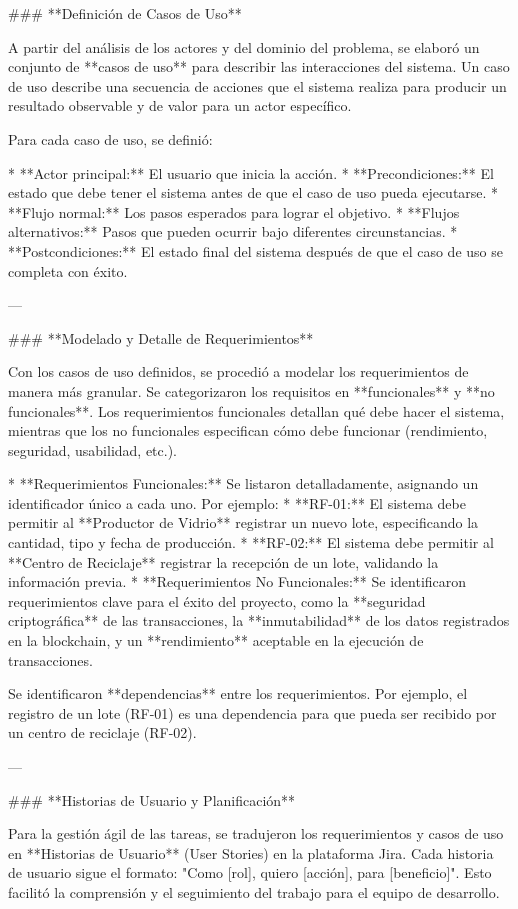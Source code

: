 ### **Definición de Casos de Uso**

A partir del análisis de los actores y del dominio del problema, se elaboró un conjunto de **casos de uso** para describir las interacciones del sistema. Un caso de uso describe una secuencia de acciones que el sistema realiza para producir un resultado observable y de valor para un actor específico.

Para cada caso de uso, se definió:

* **Actor principal:** El usuario que inicia la acción.
* **Precondiciones:** El estado que debe tener el sistema antes de que el caso de uso pueda ejecutarse.
* **Flujo normal:** Los pasos esperados para lograr el objetivo.
* **Flujos alternativos:** Pasos que pueden ocurrir bajo diferentes circunstancias.
* **Postcondiciones:** El estado final del sistema después de que el caso de uso se completa con éxito.

---

### **Modelado y Detalle de Requerimientos**

Con los casos de uso definidos, se procedió a modelar los requerimientos de manera más granular. Se categorizaron los requisitos en **funcionales** y **no funcionales**. Los requerimientos funcionales detallan qué debe hacer el sistema, mientras que los no funcionales especifican cómo debe funcionar (rendimiento, seguridad, usabilidad, etc.).

* **Requerimientos Funcionales:** Se listaron detalladamente, asignando un identificador único a cada uno. Por ejemplo:
    * **RF-01:** El sistema debe permitir al **Productor de Vidrio** registrar un nuevo lote, especificando la cantidad, tipo y fecha de producción.
    * **RF-02:** El sistema debe permitir al **Centro de Reciclaje** registrar la recepción de un lote, validando la información previa.
* **Requerimientos No Funcionales:** Se identificaron requerimientos clave para el éxito del proyecto, como la **seguridad criptográfica** de las transacciones, la **inmutabilidad** de los datos registrados en la blockchain, y un **rendimiento** aceptable en la ejecución de transacciones.

Se identificaron **dependencias** entre los requerimientos. Por ejemplo, el registro de un lote (RF-01) es una dependencia para que pueda ser recibido por un centro de reciclaje (RF-02).

---

### **Historias de Usuario y Planificación**

Para la gestión ágil de las tareas, se tradujeron los requerimientos y casos de uso en **Historias de Usuario** (User Stories) en la plataforma Jira. Cada historia de usuario sigue el formato: "Como [rol], quiero [acción], para [beneficio]". Esto facilitó la comprensión y el seguimiento del trabajo para el equipo de desarrollo.

